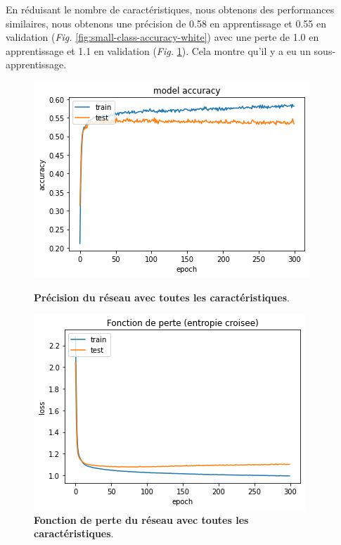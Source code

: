 En réduisant le nombre de caractéristiques, nous obtenons des performances similaires, nous obtenons une précision de 0.58 en apprentissage
et 0.55 en validation (\textit{Fig.} \ref{fig:small-class-accuracy-white}) avec une perte de 1.0 en apprentissage et 1.1 en validation
(\textit{Fig.} \ref{fig:small-class-loss-white}). Cela montre qu'il y a eu un sous-apprentissage.

\begin{figure}[ht]
	\centering
	\begin{minipage}[t]{0.48\textwidth}
		\centering
		\includegraphics[scale=0.475]{../images/vins_blancs/small_class_accuracy_white.png}
		\caption[Précision du réseau avec toutes les caractéristiques.]
		{\textbf{Précision du réseau avec toutes les caractéristiques}.}
		\label{fig:small-class-accuracy-white}
	\end{minipage}\hfill
	\begin{minipage}[t]{0.48\textwidth}
		\centering
		\includegraphics[scale=0.475]{../images/vins_blancs/small_class_loss_white.png}
		\caption[Fonction de perte du réseau avec toutes les caractéristiques.]
		{\textbf{Fonction de perte du réseau avec toutes les caractéristiques}.}
		\label{fig:small-class-loss-white}
	\end{minipage}
\end{figure}

